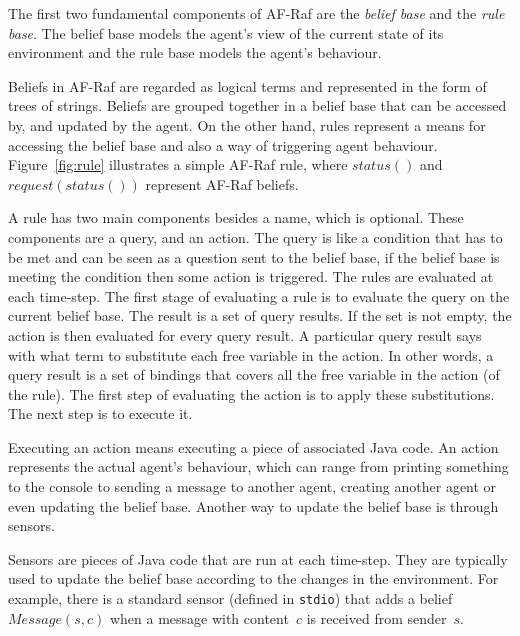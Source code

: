 \documentclass[a4paper,12pt,oneside,fleqn]{book} %
\begin{document}
The first two fundamental components of AF-Raf are the \textit{belief base}
and the \textit{rule base}. The belief base models the agent's view of the
current state of its environment and the rule base models the agent's
behaviour.

Beliefs in AF-Raf are regarded as logical terms and represented in the form
of trees of strings. Beliefs are grouped together in a belief base that can
be accessed by, and updated by the agent. On the other hand, rules
represent a means for accessing the belief base and also a way of
triggering agent behaviour. Figure~\ref{fig:rule} illustrates a simple
AF-Raf rule, where $status()$ and $request(status())$ represent AF-Raf
beliefs.

A rule has two main components besides a name, which is optional. These
components are a query, and an action. The query is like a condition that
has to be met and can be seen as a question sent to the belief base, if the
belief base is meeting the condition then some action is triggered. The
rules are evaluated at each time-step. The first stage of evaluating a rule
is to evaluate the query on the current belief base. The result is a set of
query results. If the set is not empty, the action is then evaluated for
every query result. A particular query result says with what term to
substitute each free variable in the action. In other words, a query result
is a set of bindings that covers all the free variable in the action (of
the rule). The first step of evaluating the action is to apply these
substitutions. The next step is to execute it.

Executing an action means executing a piece of associated Java code.
An action represents the actual agent's behaviour, which can
range from printing something to the console to sending a message to
another agent, creating another agent or even updating the belief base.
Another way to update the belief base is through sensors.

Sensors are pieces of Java code that are run at each time-step. They are
typically used to update the belief base according to the changes in the
environment. For example, there is a standard sensor (defined in
\texttt{stdio}) that adds a belief $\mathit{Message}(s,c)$ when a message
with content~$c$ is received from sender~$s$.

\end{document}
